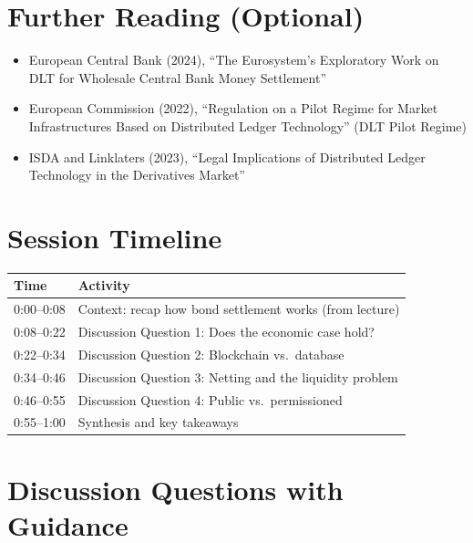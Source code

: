 \documentclass[11pt]{article}
\begin{document}
\section*{Further Reading (Optional)}

\begin{itemize}[leftmargin=*]
\item European Central Bank (2024), ``The Eurosystem's Exploratory Work on DLT for Wholesale Central Bank Money Settlement''
\item European Commission (2022), ``Regulation on a Pilot Regime for Market Infrastructures Based on Distributed Ledger Technology'' (DLT Pilot Regime)
\item ISDA and Linklaters (2023), ``Legal Implications of Distributed Ledger Technology in the Derivatives Market''
\end{itemize}

\newpage


\section*{Session Timeline}

\begin{center}
\begin{tabular}{ll}
\toprule
\textbf{Time} & \textbf{Activity} \\
\midrule
0:00--0:08 & Context: recap how bond settlement works (from lecture) \\
0:08--0:22 & Discussion Question 1: Does the economic case hold? \\
0:22--0:34 & Discussion Question 2: Blockchain vs.\ database \\
0:34--0:46 & Discussion Question 3: Netting and the liquidity problem \\
0:46--0:55 & Discussion Question 4: Public vs.\ permissioned \\
0:55--1:00 & Synthesis and key takeaways \\
\bottomrule
\end{tabular}
\end{center}

\section*{Discussion Questions with Guidance}
\end{document}

